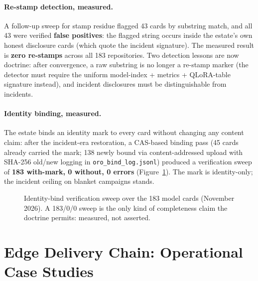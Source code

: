 \paragraph{Re-stamp detection, measured.} A follow-up sweep for stamp residue flagged 43 cards by substring match, and all 43 were verified \textbf{false positives}: the flagged string occurs inside the estate's own honest disclosure cards (which quote the incident signature). The measured result is \textbf{zero re-stamps} across all 183 repositories. Two detection lessons are now doctrine: after convergence, a raw substring is no longer a re-stamp marker (the detector must require the uniform model-index + metrics + QLoRA-table signature instead), and incident disclosures must be distinguishable from incidents.

\paragraph{Identity binding, measured.} The estate binds an identity mark to every card without changing any content claim: after the incident-era restoration, a CAS-based binding pass (45 cards already carried the mark; 138 newly bound via content-addressed upload with SHA-256 old/new logging in \texttt{oro\_bind\_log.jsonl}) produced a verification sweep of \textbf{183 with-mark, 0 without, 0 errors} (Figure~\ref{fig:oro}). The mark is identity-only; the incident ceiling on blanket campaigns stands.

\begin{figure}[htbp]
\centering
{}
\caption{Identity-bind verification sweep over the 183 model cards (November 2026). A 183/0/0 sweep is the only kind of completeness claim the doctrine permits: measured, not asserted.}
\label{fig:oro}
\end{figure}

\section{Edge Delivery Chain: Operational Case Studies}
\label{sec:edge}

